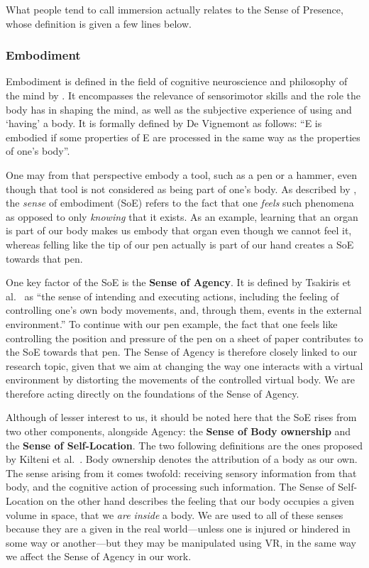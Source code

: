 What people tend to call immersion actually relates to the Sense of Presence, whose definition is given a few lines below.

\subsubsection{Embodiment}
\label{sec:embodiment}
Embodiment is defined in the field of cognitive neuroscience and philosophy of the mind by \cite{blanke2009full,debarba2017embodiment}. It encompasses the relevance of sensorimotor skills and the role the body has in shaping the mind, as well as the subjective experience of using and `having' a body. It is formally defined by De Vignemont \cite{de2011embodiment} as follows: ``E is embodied if some properties of E are processed in the same way as the properties of one’s body''.

One may from that perspective embody a tool, such as a pen or a hammer, even though that tool is not considered as being part of one's body. As described by \cite{debarba2017embodiment}, the \textit{sense} of embodiment (SoE) refers to the fact that one \textit{feels} such phenomena as opposed to only \textit{knowing} that it exists. As an example, learning that an organ is part of our body makes us embody that organ even though we cannot feel it, whereas felling like the tip of our pen actually is part of our hand creates a SoE towards that pen.

One key factor of the SoE is the \textbf{Sense of Agency}. It is defined by Tsakiris et al.\ \cite{tsakiris2006having} as ``the sense of intending and executing actions, including the feeling of controlling one’s own body movements, and, through them, events in the external environment.'' To continue with our pen example, the fact that one feels like controlling the position and pressure of the pen on a sheet of paper contributes to the SoE towards that pen. The Sense of Agency is therefore closely linked to our research topic, given that we aim at changing the way one interacts with a virtual environment by distorting the movements of the controlled virtual body. We are therefore acting directly on the foundations of the Sense of Agency.

Although of lesser interest to us, it should be noted here that the SoE rises from two other components, alongside Agency: the \textbf{Sense of Body ownership} and the \textbf{Sense of Self-Location}. The two following definitions are the ones proposed by Kilteni et al.\ \cite{kilteni2012sense}. Body ownership denotes the attribution of a body as our own. The sense arising from it comes twofold: receiving sensory information from that body, and the cognitive action of processing such information. The Sense of Self-Location on the other hand describes the feeling that our body occupies a given volume in space, that we \textit{are inside} a body. We are used to all of these senses because they are a given in the real world---unless one is injured or hindered in some way or another---but they may be manipulated using VR, in the same way we affect the Sense of Agency in our work.

